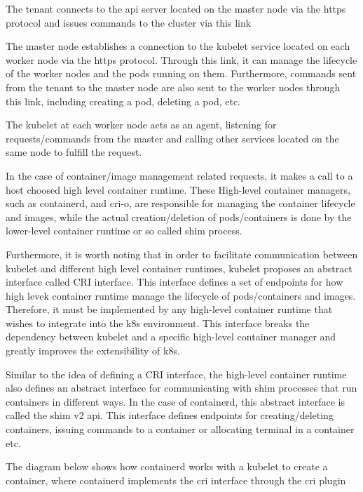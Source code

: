     The tenant connects to the api server located on the master node via the https protocol and issues commands to the cluster via this link
    
    The master node establishes a connection to the kubelet service located on each worker node via the https protocol. Through this link, it can manage the lifecycle of the worker nodes and the pods running on them. Furthermore, commands sent from the tenant to the master node 
    are also sent to the worker nodes through this link, including creating a pod, deleting a pod, etc.
    
    The kubelet at each worker node acts as an agent, listening for requests/commands from the master and calling other services located on the same node to fulfill the request.
    
    In the case of container/image management related requests, it makes a call to a host choosed high level container runtime.
    These High-level container managers, such as containerd, and cri-o, are responsible for managing the container lifecycle and images, while the actual creation/deletion of pods/containers is done by the lower-level container runtime or so called shim process.

    Furthermore, it is worth noting that in order to facilitate communication between kubelet and different high level container runtimes, kubelet proposes an abstract interface called CRI interface. This interface defines a set 
    of endpoints for how high levek container runtime manage the lifecycle of pods/containers and images. Therefore, it must be implemented by any high-level container runtime that wishes to integrate into the k8s environment. This interface breaks the dependency between kubelet 
    and a specific high-level container manager and greatly improves the extensibility of k8s.
    
    Similar to the idea of defining a CRI interface, the high-level container runtime also defines an abstract interface for communicating with shim processes that run containers in different ways. In the case of containerd, this abstract interface is called the shim v2 api. 
    This interface defines endpoints for creating/deleting containers, issuing commands to a container or allocating terminal in a container etc.




    The diagram below shows how containerd works with a kubelet to create a container, where containerd implements the cri interface through the cri plugin


